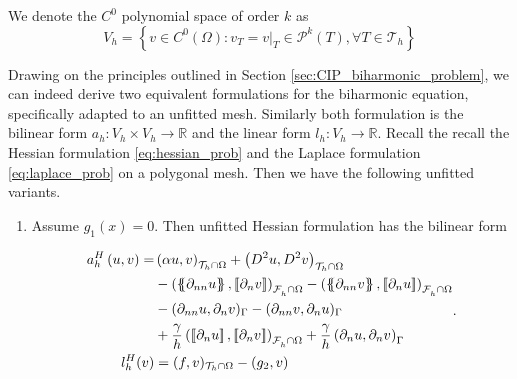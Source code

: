 We denote the $C^{0}$ polynomial space of order $k$ as
\[
V_{h} = \left\{ v \in C^{0}\left( \Omega  \right): v_{T} = v | _{T} \in \mathcal{P} ^{k}\left( T \right), \forall T \in
\mathcal{T}_{h}    \right\}
\]


Drawing on the principles outlined in Section \ref{sec:CIP_biharmonic_problem}, we can indeed derive two equivalent formulations for the biharmonic equation, specifically adapted to an unfitted mesh. Similarly both formulation is the bilinear form
$a_{h}:V_{h}
\times V_{h} \to  \mathbb{R}  $ and the linear form $l_{h}: V_{h} \to \mathbb{R} $. Recall the recall the Hessian formulation \eqref{eq:hessian_prob} and the Laplace formulation \eqref{eq:laplace_prob} on a polygonal mesh. Then we have the following
unfitted variants.

\begin{enumerate}[label=\arabic*)]
    \item Assume $g_{1}( x) = 0 $. Then unfitted Hessian formulation has the bilinear form

\begin{equation}
        \label{eq:cip_unfitted_hessian_form}
\begin{split}
a_{h}^{H} \left( u, v \right)   =&   \left( \alpha  u, v \right) _{\mathcal{T} _{h} \cap \Omega }   +  \left( D^2 u, D^2v \right) _{\mathcal{T} _{h} \cap \Omega} \\
 & -
  \left( \mean{  \partial _{n n} u }, \jump{ \partial _{n }v} \right)_{\mathcal{F}_{h}^{} \cap \Omega}  -
 \left( \mean{ \partial _{n n} v }, \jump{ \partial _{n}u }      \right)_{\mathcal{F}_{h}^{} \cap \Omega} \\
 & - ( \partial _{nn} u, \partial _{n} v)_{\Gamma } - ( \partial _{nn} v, \partial _{n} u)_{\Gamma }
 \\
 & + \frac{\gamma }{h}  \left( \jump{ \partial _{n} u}, \jump{ \partial _{n} v_{}   }   \right)_{\mathcal{F}_{h}^{} \cap \Omega} +  \frac{\gamma }{h}  \left(  \partial _{n} u,  \partial _{n} v_{}      \right)_{\Gamma } \\
l_{h}^{H}( v) & =  ( f,v)_{\mathcal{T} _{h} \cap \Omega } - (g_{2},v)
\end{split}
.
\end{equation}


\end{enumerate}
